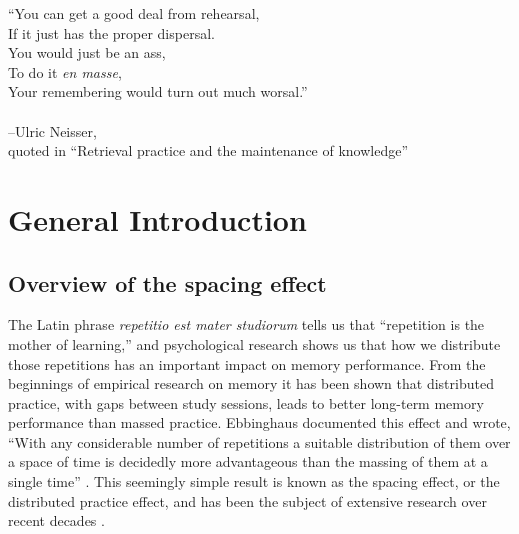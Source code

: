 
\begin{center}

\vspace{5cm}

``You can get a good deal from rehearsal,\\
If it just has the proper dispersal.\\
You would just be an ass,\\
To do it \textit{en masse},\\
Your remembering would turn out much worsal.''\\
~\\
--Ulric Neisser,\\
{\small quoted in ``Retrieval practice and the maintenance of knowledge'' \cite{Bjor1988}}
\end{center}

\newpage

\chapter{General Introduction}


\section{Overview of the spacing effect}


The Latin phrase \textit{repetitio est mater studiorum} tells us that ``repetition is the mother of learning,'' and psychological research shows us that how we distribute those repetitions has an important impact on memory performance.  From the beginnings of empirical research on memory it has been shown that distributed practice, with gaps between study sessions, leads to better long-term memory performance than massed practice.  Ebbinghaus documented this effect and wrote, ``With any considerable number of repetitions a suitable distribution of them over a space of time is decidedly more advantageous than the massing of them at a single time'' \cite[p.~89]{Ebbi1885}.  This seemingly simple result is known as the spacing effect, or the distributed practice effect, and has been the subject of extensive research over recent decades \cite<for reviews, see>{CepeEtal2006,CepeEtal2009,DelaEtal2010}.

